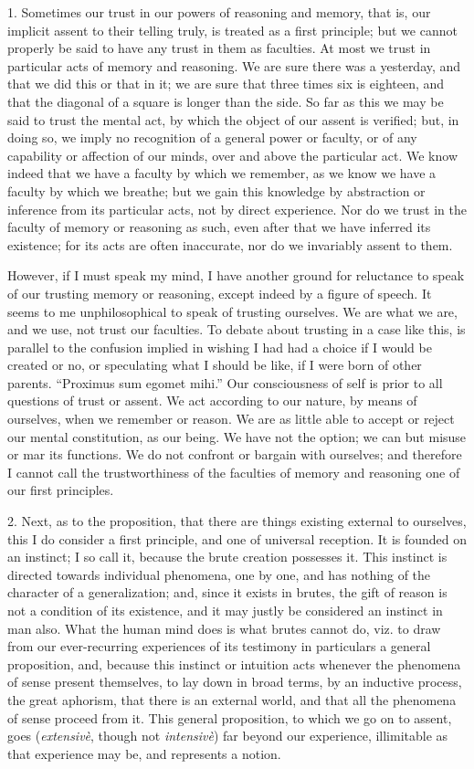 1. Sometimes our trust in our powers of reasoning and memory, that
is, our implicit assent to their telling truly, is treated as a first
principle; but we cannot properly be said to have any trust in them as
faculties. At most we trust in particular acts of memory and
reasoning. We are sure there was a yesterday, and that we did this or
that in it; we are sure that three times six is eighteen, and that the
diagonal of a square is longer than the side. So far as this we may be
said to trust the mental act, by which the object of our assent is
verified; but, in doing so, we imply no recognition of a general power
or faculty, or of any capability or affection of our minds, over and
above the particular act. We know indeed that we have a faculty
by which we remember, as we know we have a faculty by which we
breathe; but we gain this knowledge by abstraction or inference from
its particular acts, not by direct experience. Nor do we trust in the
faculty of memory or reasoning as such, even after that we have
inferred its existence; for its acts are often inaccurate, nor do we
invariably assent to them.

However, if I must speak my mind, I have another ground for
reluctance to speak of our trusting memory or reasoning, except indeed
by a figure of speech. It seems to me unphilosophical to speak of
trusting ourselves. We are what we are, and we use, not trust our
faculties. To debate about trusting in a case like this, is parallel
to the confusion implied in wishing I had had a choice if I would be
created or no, or speculating what I should be like, if I were born of
other parents. ``Proximus sum egomet mihi.'' Our consciousness
of self is prior to all questions of trust or assent. We act according
to our nature, by means of ourselves, when we remember or reason. We
are as little able to accept or reject our mental constitution, as our
being. We have not the option; we can but misuse or mar its functions.
We do not confront or bargain with ourselves; and therefore I cannot
call the trustworthiness of the faculties of memory and reasoning one
of our first principles.

2. Next, as to the proposition, that there are things existing
external to ourselves, this I do consider a first principle, and one
of universal reception. It is founded on an instinct; I so call it,
because the brute creation possesses it. This instinct is directed
towards individual phenomena, one by one, and has nothing of the
character of a generalization; and, since it exists in brutes, the
gift of reason is not a condition of its existence, and it may justly
be considered an instinct in man also. What the human mind does is
what brutes cannot do, viz. to draw from our ever-recurring
experiences of its testimony in particulars a general proposition,
and, because this instinct or intuition acts whenever the phenomena of
sense present themselves, to lay down in broad terms, by an inductive
process, the great aphorism, that there is an external world, and that
all the phenomena of sense proceed from it. This general proposition,
to which we go on to assent, goes (\emph{extensivè}, though not \emph{intensivè})
far beyond our experience, illimitable as that experience may be, and
represents a notion.

